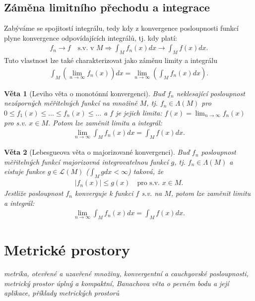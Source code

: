 \documentclass[a4]{report}
\newtheorem{theorem}{Věta}
\theoremstyle{definition}
\begin{document}
{\subsection{Záměna limitního přechodu a integrace}
Zabýváme se spojitostí integrálu, tedy kdy z konvergence posloupnosti funkcí plyne konvergence odpovídajících integrálů, tj. kdy platí:
\begin{align*}
f_n\rightarrow f\quad \text{s.v. v } M\Rightarrow \int_M f_n(x)dx\rightarrow\int_M f(x)dx.
\end{align*}
Tuto vlastnost lze také charakterizovat jako záměnu limity a integrálu
\begin{align*}
\int_M (\lim_{n\rightarrow\infty} f_n(x))dx=\lim_{n\rightarrow\infty}(\int_M f_n(x)dx).
\end{align*}
\begin{theorem}[Leviho věta o monotónní konvergenci]
Buď $f_n$ neklesající posloupnost nezáporných měřitelných funkcí na množině $M$, tj. $f_n\in \Lambda(M)$ pro $0\leq f_1(x)\leq\ldots\leq f_n(x)\leq\ldots$ a $f$ je jejich limita: $f(x)=\lim_{n\rightarrow\infty}f_n(x)$ pro s.v. $x\in M$. Potom lze zaměnit limitu a integrál:
\begin{align*}
\lim_{n\rightarrow\infty}\int_M f_n(x)dx=\int_M f(x)dx.
\end{align*}
\end{theorem}
\begin{theorem}[Lebesgueova věta o majorizované konvergenci]
Buď $f_n$ posloupnost měřitelných funkcí majorizovná integrovatelnou funkcí $g$, tj. $f_n\in\Lambda(M)$ a eistuje funkce $g\in\mathscr{L}(M)$ ($\int_M g dx<\infty$) taková, že
\begin{align*}
|f_n(x)|\leq g(x)\quad\text{pro s.v. }x\in M.
\end{align*}
Jestliže posloupnost $f_n$ konverguje k funkci $f$ s.v. na $M$, potom lze zaměnit limitu a integrál:
\begin{align*}
\lim_{n\rightarrow\infty}\int_M f_n(x)dx=\int_M f(x)dx.
\end{align*}
\end{theorem}

\section{Metrické prostory}
\textit{metrika, otevřené a uzavřené množiny, konvergentní a cauchyovské posloupnosti, metrický prostor úplný a kompaktní, Banachova věta o pevném bodu a její aplikace, příklady metrických prostorů}
}
\end{document}
